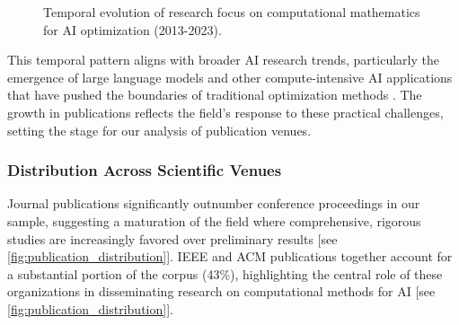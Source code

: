 \documentclass[format=acmsmall, natbib=true, citestyle=acmauthoryear]{acmart}
\begin{document}
\begin{figure}[ht]
    \centering
    \caption{Temporal evolution of research focus on computational mathematics for AI optimization (2013-2023).}
    \label{fig:temporal_evolution}
\end{figure}

This temporal pattern aligns with broader AI research trends, particularly the emergence of large language models and other compute-intensive AI applications that have pushed the boundaries of traditional optimization methods \citep{ataei2024filtering}. The growth in publications reflects the field's response to these practical challenges, setting the stage for our analysis of publication venues.

\subsubsection{Distribution Across Scientific Venues}\label{subsubsec:overview-of-included-studies:distribution-across-scientific-venues}
Journal publications significantly outnumber conference proceedings in our sample, suggesting a maturation of the field where comprehensive, rigorous studies are increasingly favored over preliminary results [see \cref{fig:publication_distribution}]. IEEE and ACM publications together account for a substantial portion of the corpus (43\%), highlighting the central role of these organizations in disseminating research on computational methods for AI [see \cref{fig:publication_distribution}].
\end{document}
